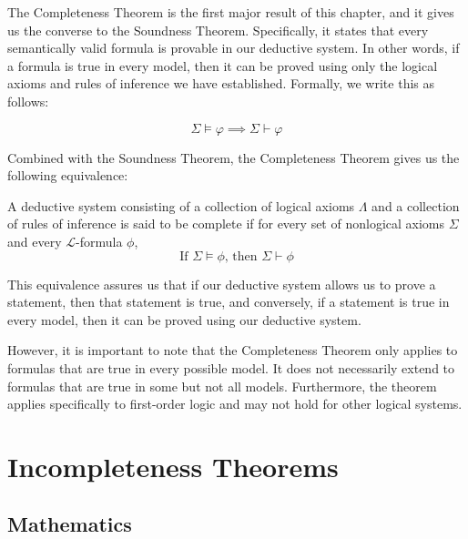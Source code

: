 \documentclass[10pt,a4paper]{article}
\newcounter{theo}
\newcommand{\curveL}{\mathcal{L}}
\begin{document}
                The Completeness Theorem is the first major result of this chapter, and it gives us the converse to the Soundness Theorem. Specifically, it states that every semantically valid formula is provable in our deductive system. In other words, if a formula is true in every model, then it can be proved using only the logical axioms and rules of inference we have established. Formally, we write this as follows:

                \begin{equation} 
                    \Sigma \models \varphi \implies \Sigma \vdash \varphi
                \end{equation}
                
                Combined with the Soundness Theorem, the Completeness Theorem gives us the following equivalence:
                
                \begin{define}
                    A deductive system consisting of a collection of logical axioms $\Lambda$ and a collection of rules of inference is said to be complete if for every set of nonlogical axioms $\Sigma$ and every $\curveL$-formula $\phi$,
                    \begin{equation}
                        \text{If } \Sigma\vDash\phi \text{, then } \Sigma\vdash\phi
                    \end{equation}
                \end{define}

                This equivalence assures us that if our deductive system allows us to prove a statement, then that statement is true, and conversely, if a statement is true in every model, then it can be proved using our deductive system.
                
                However, it is important to note that the Completeness Theorem only applies to formulas that are true in every possible model. It does not necessarily extend to formulas that are true in some but not all models. Furthermore, the theorem applies specifically to first-order logic and may not hold for other logical systems.
            \section{Incompleteness Theorems}
                \subsection{Mathematics}
\end{document}
